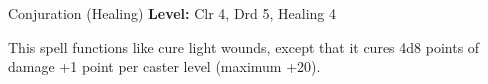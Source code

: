 {Conjuration (Healing)}
{
	\textbf{Level:}
	Clr 4, Drd 5, Healing 4\\
}
{
	This spell functions like cure light wounds, except that it cures 4d8 points of damage +1 point per caster level (maximum +20).

}
